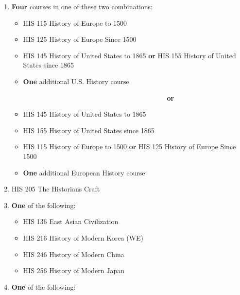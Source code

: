 \documentclass[
  letterpaper,
]{scrbook}
\providecommand{\tightlist}{%
  \setlength{\itemsep}{0pt}\setlength{\parskip}{0pt}}
\begin{document}
\begin{enumerate}
\def\labelenumi{\arabic{enumi}.}
\item
  \textbf{Four} courses in one of these two combinations:

  \begin{itemize}
  \tightlist
  \item
    HIS 115 History of Europe to 1500\\
  \item
    HIS 125 History of Europe Since 1500\\
  \item
    HIS 145 History of United States to 1865 \textbf{or} HIS 155 History
    of United States since 1865\\
  \item
    \textbf{One} additional U.S. History course
  \end{itemize}

  ~~~~~~~~~~~~~~~~~~~~~~~~~~~~~~~~~~~~~~~~~~~~~ \textbf{or}

  \begin{itemize}
  \tightlist
  \item
    HIS 145 History of United States to 1865\\
  \item
    HIS 155 History of United States since 1865\\
  \item
    HIS 115 History of Europe to 1500 \textbf{or} HIS 125 History of
    Europe Since 1500\\
  \item
    \textbf{One} additional European History course
  \end{itemize}
\item
  HIS 205 The Historians Craft\\
\item
  \textbf{One} of the following:

  \begin{itemize}
  \tightlist
  \item
    HIS 136 East Asian Civilization\\
  \item
    HIS 216 History of Modern Korea (WE)\\
  \item
    HIS 246 History of Modern China\\
  \item
    HIS 256 History of Modern Japan\\
  \end{itemize}
\item
  \textbf{One} of the following:


\end{enumerate}
\end{document}

